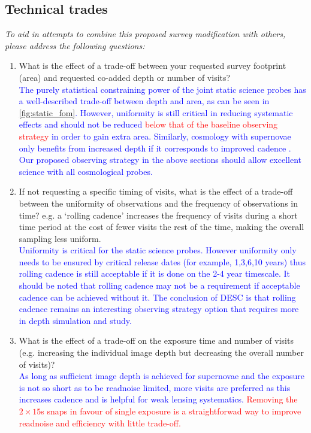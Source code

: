 \documentclass[12pt, letterpaper]{article}
\newcommand{\ml}[1]{{\textcolor{blue}{#1}}}
\newcommand{\review}[1]{{\textcolor{red}{#1}}}
\begin{document}
\subsection{Technical trades}
\begin{footnotesize}
{\it To aid in attempts to combine this proposed survey modification with others, please address the following questions:
\begin{enumerate}
    \item What is the effect of a trade-off between your requested survey footprint (area) and requested co-added depth or number of visits?\\
    \ml{The purely statistical constraining power of the joint static science probes has a well-described trade-off between depth and area, as can be seen in \autoref{fig:static_fom}. However, uniformity is still critical in reducing systematic effects and should not be reduced \review{below that of the baseline observing strategy} in order to gain extra area. Similarly, cosmology with supernovae only benefits from increased depth if it corresponds to improved cadence \revew{(for a given exposure time)}. Our proposed observing strategy in the above sections should allow excellent science with all cosmological probes.}
    \item If not requesting a specific timing of visits, what is the effect of a trade-off between the uniformity of observations and the frequency of observations in time? e.g. a `rolling cadence' increases the frequency of visits during a short time period at the cost of fewer visits the rest of the time, making the overall sampling less uniform.\\
    \ml{Uniformity is critical for the static science probes. However uniformity only needs to be ensured by critical release dates (for example, 1,3,6,10 years) thus rolling cadence is still acceptable if it is done on the 2-4 year timescale. It should be noted that rolling cadence may not be a requirement if acceptable cadence can be achieved without it. The conclusion of DESC is that rolling cadence remains an interesting observing strategy option that requires more in depth simulation and study.}
    \item What is the effect of a trade-off on the exposure time and number of visits (e.g. increasing the individual image depth but decreasing the overall number of visits)?\\
    \ml{As long as sufficient image depth is achieved for supernovae and the exposure is not so short as to be readnoise limited, more visits are preferred as this increases cadence and is helpful for weak lensing systematics. \review{Removing the $2\times15$s snaps in favour of single exposure is a straightforwad way to improve readnoise and efficiency with little trade-off.}}

\end{enumerate}}
\end{footnotesize}
\end{document}
